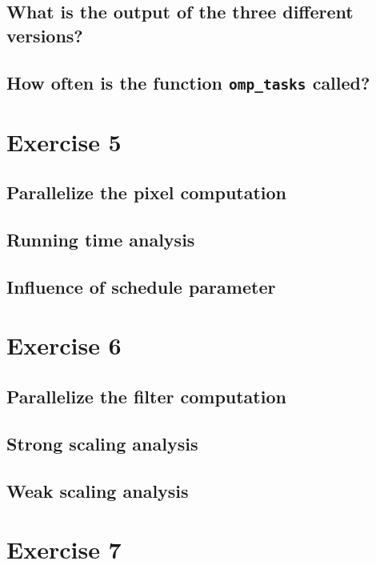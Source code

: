\documentclass[a4paper,%
11pt,%
DIV12,
headsepline,%
headings=normal,
]{scrartcl}
\begin{document}
\subsection{What is the output of the three different versions?}

\subsection{How often is the function \texttt{omp\_tasks} called?}

\section{Exercise 5}

\subsection{Parallelize the pixel computation}

\subsection{Running time analysis}

\subsection{Influence of schedule parameter}

\section{Exercise 6}

\subsection{Parallelize the filter computation}

\subsection{Strong scaling analysis}

\subsection{Weak scaling analysis}

\section{Exercise 7}
\end{document}
